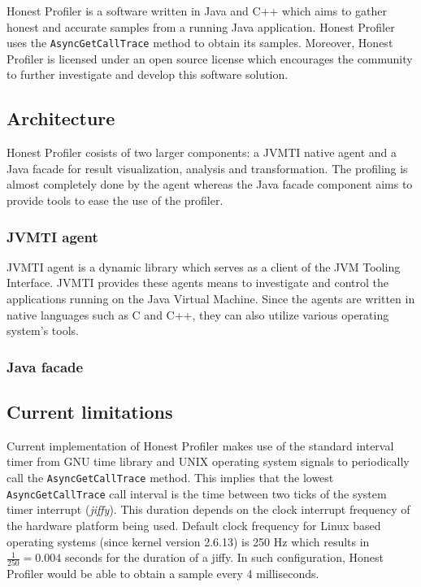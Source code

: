 \documentclass[..thesis.tex]{subfiles}
\begin{document}
Honest Profiler \cite{hon_prof} is a software written in Java and C++ which aims to gather honest and accurate samples from a running Java application. Honest Profiler uses the \texttt{AsyncGetCallTrace} method to obtain its samples. Moreover, Honest Profiler is licensed under an open source license which encourages the community to further investigate and develop this software solution.

\subsection{Architecture}
Honest Profiler cosists of two larger components: a JVMTI native agent and a Java facade for result visualization, analysis and transformation. The profiling is almost completely done by the agent whereas the Java facade component aims to provide tools to ease the use of the profiler.

\subsubsection{JVMTI agent}
JVMTI agent is a dynamic library which serves as a client of the JVM Tooling Interface. JVMTI provides these agents means to investigate and control the applications running on the Java Virtual Machine. Since the agents are written in native languages such as C and C++, they can also utilize various operating system's tools.


\subsubsection{Java facade}

\subsection{Current limitations}
Current implementation of Honest Profiler makes use of the standard interval timer from GNU time library and UNIX operating system signals to periodically call the \texttt{AsyncGetCallTrace} method. This implies that the lowest \texttt{AsyncGetCallTrace} call interval is the time between two ticks of the system timer interrupt (\textit{jiffy}). This duration depends on the clock interrupt frequency of the hardware platform being used. Default clock frequency for Linux based operating systems (since kernel version 2.6.13) is 250 Hz which results in $\frac{1}{250} = 0.004$ seconds for the duration of a jiffy. \cite{linux_time} In such configuration, Honest Profiler would be able to obtain a sample every 4 milliseconds.
\end{document}
